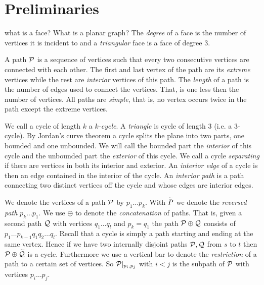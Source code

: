 
\section{Preliminaries}

  \fxnote what is a face? What is a planar graph?
  The \emph{degree} of a face is the number of vertices it is incident to and a \emph{triangular} face is a face of degree $3$.

  A path $\P$ is a sequence of vertices such that every two consecutive vertices are connected with each other. The first and last vertex of the path are its \emph{extreme} vertices while the rest are \emph{interior} vertices of this path. The \emph{length} of a path is the number of edges used to connect the vertices. That, is one less then the number of vertices. All paths are \emph{simple}, that is, no vertex occurs twice in the path except the extreme vertices.

  We call a cycle of length $k$  a \emph{$k$-cycle}. A \emph{triangle} is cycle of length $3$ (i.e. a $3$-cycle).
  By Jordan's curve theorem a cycle splits the plane into two parts, one bounded and one unbounded. We will call the bounded part the \emph{interior} of this cycle and the unbounded part the \emph{exterior} of this cycle.
  We call a cycle \emph{separating} if there are vertices in both its interior and exterior.
  An \emph{interior edge} of a cycle is then an edge contained in the interior of the cycle.
  An \emph{interior path} is a path connecting two distinct vertices off the cycle and whose edges are interior edges.

  We denote the vertices of a path $\P$ by $p_1 \ldots p_k$.
  With $\rev{P}$ we denote the \emph{reversed path} $p_k \ldots p_1$. We use $\oplus$ to denote the \emph{concatenation} of paths. That is, given a second path $\Q$ with vertices $q_1 \ldots q_l$ and $p_k = q_1$ the path $\P \oplus \Q$ consists of $p_1 \ldots p_{k-1} q_1 q_2 \ldots q_l$.
  Recall that a cycle is simply a path starting and ending at the same vertex. Hence if we have two  internally disjoint paths $\P, \Q$ from $s$ to $t$ then $\P \oplus \rev{\Q}$ is a cycle.
  Furthermore we use a vertical bar to denote the \emph{restriction} of a path to a certain set of vertices. So $\P|_{p_i, p_j}$ with $i<j$ is the subpath of $\P$ with vertices $p_i \ldots p_j$.

